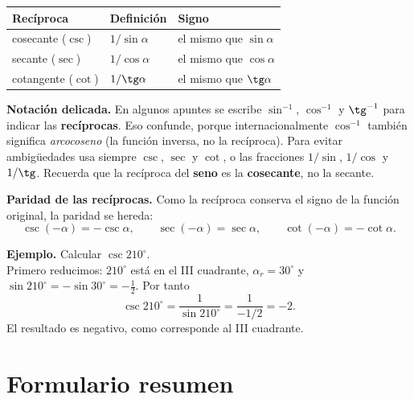 \documentclass[12pt, letterpaper]{article}
\providecommand{\sen}{\sin}
\begin{document}
\begin{center}
\small
\begin{tabular}{@{}lll@{}}
  \toprule
  \textbf{Recíproca} & \textbf{Definición} & \textbf{Signo} \\
  \midrule
  cosecante ($\csc$) & $1/\sen\alpha$ & el mismo que $\sen\alpha$ \\
  secante ($\sec$)   & $1/\cos\alpha$ & el mismo que $\cos\alpha$ \\
  cotangente ($\cot$) & $1/\tg\alpha$  & el mismo que $\tg\alpha$ \\
  \bottomrule
\end{tabular}
\end{center}

\begin{cuadroadvertencia}[nobreak]
  \small
  \textbf{Notación delicada.} En algunos apuntes se escribe
  $\sen^{-1}$, $\cos^{-1}$ y $\tg^{-1}$ para indicar las \textbf{recíprocas}.
  Eso confunde, porque internacionalmente $\cos^{-1}$ también significa
  \emph{arcocoseno} (la función inversa, no la recíproca). Para evitar
  ambigüedades usa siempre $\csc$, $\sec$ y $\cot$, o las fracciones
  $1/\sen$, $1/\cos$ y $1/\tg$. Recuerda que la recíproca del \textbf{seno}
  es la \textbf{cosecante}, no la secante.
\end{cuadroadvertencia}

\begin{cuadroteoria}
  \small
  \textbf{Paridad de las recíprocas.} Como la recíproca conserva el signo de
  la función original, la paridad se hereda:
  \[
    \csc(-\alpha)=-\csc\alpha,\qquad
    \sec(-\alpha)=\sec\alpha,\qquad
    \cot(-\alpha)=-\cot\alpha.
  \]
\end{cuadroteoria}

\begin{cuadrosolucion}
  \small
  \textbf{Ejemplo.} Calcular $\csc 210^\circ$.\\[2pt]
  Primero reducimos: $210^\circ$ está en el III cuadrante,
  $\alpha_r=30^\circ$ y $\sen 210^\circ=-\sen 30^\circ=-\tfrac12$. Por tanto
  \[
    \csc 210^\circ=\frac{1}{\sen 210^\circ}=\frac{1}{-1/2}=-2.
  \]
  El resultado es negativo, como corresponde al III cuadrante.
\end{cuadrosolucion}

\section{Formulario resumen}
\end{document}
